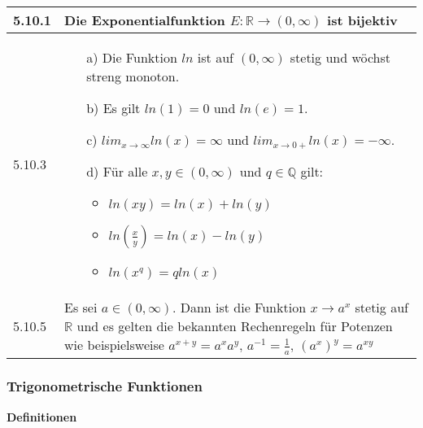    \begin{longtable}{p{1cm} p{16cm}}
        \toprule

        5.10.1& Die Exponentialfunktion $E: \mathbb{R} \rightarrow (0,\infty)$ ist \textbf{bijektiv} \\
        \midrule
        5.10.3& \begin{itemize}[topsep=-0.5cm]
                    \item[a)] Die Funktion $ln$ ist auf $(0, \infty)$ stetig und wöchst streng monoton.
                    \item[b)] Es gilt $ln(1) = 0$ und $ln(e) = 1$.
                    \item[c)] $lim_{x \rightarrow \infty} ln(x) = \infty$ und $lim_{x \rightarrow 0+} ln(x) = -\infty$.
                    \item[d)] Für alle $x, y \in (0, \infty)$ und $q \in \mathbb{Q}$ gilt:
                                \begin{itemize}[topsep=-0.5cm]
                                    \item $ln(xy) = ln(x) + ln(y)$
                                    \item $ln(\frac{x}{y}) = ln(x) - ln(y)$
                                    \item $ln(x^q) = q ln(x)$
                                \end{itemize} \vspace{-0cm} 
                \end{itemize} \vspace{-0cm} \\
        \midrule
        5.10.5& Es sei $a \in (0,\infty)$. Dann ist die Funktion $x \rightarrow a^x$ stetig auf $\mathbb{R}$ und es gelten die bekannten
                Rechenregeln für Potenzen wie beispielsweise $a^{x+y}=a^xa^y$, $a^{-1}=\frac{1}{a}$, $(a^x)^y=a^{xy}$ \\

        \bottomrule
    \end{longtable}
    

\subsubsection{Trigonometrische Funktionen}

    \noindent
    \textbf{Definitionen}
      
